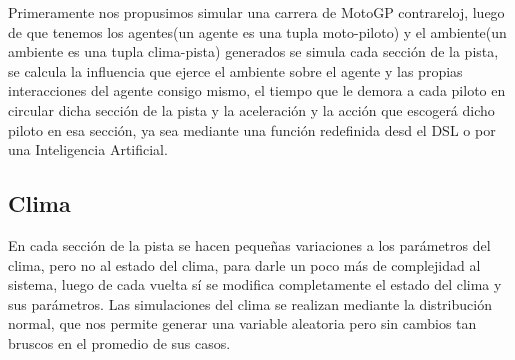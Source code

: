 Primeramente nos propusimos simular una carrera de MotoGP contrareloj, luego de que tenemos los agentes(un agente es una tupla moto-piloto) y el ambiente(un ambiente es una tupla clima-pista) generados se simula cada sección de la pista, se calcula la influencia que ejerce el ambiente sobre el agente y las propias interacciones del agente consigo mismo, el tiempo que le demora a cada piloto en circular dicha sección de la pista y la aceleración y la acción que escogerá dicho piloto en esa sección, ya sea mediante una función redefinida desd el DSL o por una Inteligencia Artificial.

\subsection{Clima}
	En cada sección de la pista se hacen pequeñas variaciones a los parámetros del clima, pero no al estado del clima, para darle un poco más de complejidad al sistema, luego de cada vuelta sí se modifica completamente el estado del clima y sus parámetros. Las simulaciones del clima se realizan mediante la distribución normal, que nos permite generar una variable aleatoria pero sin cambios tan bruscos en el promedio de sus casos.
	
